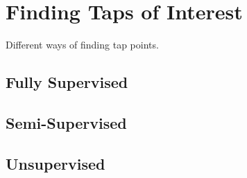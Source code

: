 \section{Finding Taps of Interest}

Different ways of finding tap points.

\subsection{Fully Supervised}

\subsection{Semi-Supervised}

\subsection{Unsupervised}
